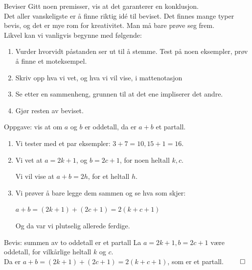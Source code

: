 

\begin{frame}{Beviser}
    Gitt noen premisser, vis at det garanterer en konklusjon.\\

    Det aller vanskeligste er å finne riktig idé til beviset. Det finnes mange typer bevis, og det er mye rom for kreativitet. Man må bare prøve seg frem.\\
    
    \pause
    Likvel kan vi vanligvis begynne med følgende:
    \begin{enumerate}
        \item Vurder hvorvidt påstanden ser ut til å stemme. Test på noen eksempler, prøv å finne et moteksempel.
        \pause
        \item Skriv opp hva vi vet, og hva vi vil vise, i mattenotasjon
        \pause
        \item Se etter en sammenheng, grunnen til at det ene impliserer det andre.
        \pause
        \item Gjør resten av beviset.
    \end{enumerate}
\end{frame}

\begin{frame}{Oppgave: vis at om $a$ og $b$ er oddetall, da er $a + b$ et partall.}
    \pause
    \begin{enumerate}
        \item Vi tester med et par eksempler: $3+7 = 10, 15+1 = 16$.
        \pause
        \item Vi vet at $a = 2k + 1$, og $b = 2c + 1$, for noen heltall $k, c$. 
        
        Vi vil vise at $a + b = 2h$, for et heltall $h$.
        \pause
        \item Vi prøver å bare legge dem sammen og se hva som skjer:
        
        $a + b = (2k + 1) + (2c + 1) = 2(k + c + 1)$

        Og da var vi plutselig allerede ferdige.
    \end{enumerate}

    \pause
    \begin{block}{Bevis: summen av to oddetall er et partall}
        La $a = 2k + 1, b = 2c + 1$ være oddetall, for vilkårlige heltall $k$ og $c$.\\\pause
        Da er $a + b = (2k + 1) + (2c + 1) = 2(k + c + 1)$, som er et partall. $\qed$
    \end{block}
\end{frame}

